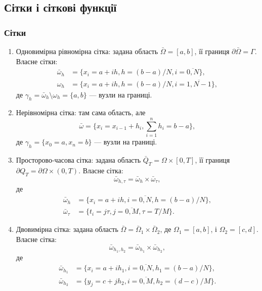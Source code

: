 \subsection{Сітки і сіткові функції}

\subsubsection{Сітки}

\begin{enumerate}
    \item Одновимірна рівномірна сітка: задана область $\bar \Omega = [a, b]$, її границя $\partial \bar \Omega = \Gamma$. Власне сітки:
    \begin{align}
        \label{eq:4.2.1}
        \bar \omega_h &= \{x_i = a + i h, h = (b - a) / N, i = \overline{0, N}\}, \\
        \label{eq:4.2.2}
        \omega_h &= \{x_i = a + i h, h = (b - a) / N, i = \overline{1, N - 1}\},
    \end{align}
    де $\gamma_h = \bar \omega_h \setminus \omega_h = \{a, b\}$ --- вузли на границі.
    
    \item Нерівномірна сітка: там сама область, але
    \begin{equation}
        \label{eq:4.2.3}
        \bar \omega = \{ x_i = x_{i - 1} + h_i, \sum_{i = 1}^n h_i = b - a \} ,
    \end{equation}
    де $\gamma_h = \{x_0 = a, x_n = b\}$ --- вузли на границі.
    
    \item Просторово-часова сітка: задана область $\bar Q_T = \Omega \times [0, T]$, її границя $\partial Q_T = \partial \Omega \times (0, T)$. Власне сітка:
    \begin{equation}
        \label{eq:4.2.4}
        \bar \omega_{h, \tau} = \bar \omega_h \times \bar \omega_\tau,
    \end{equation}
    де
    \begin{align}
        \label{eq:4.2.5}
        \bar \omega_h &= \{ x_i = a + i h, i = \overline{0, N}, h = (b - a) / N\}, \\
        \label{eq:4.2.6}
        \bar \omega_\tau &= \{ t_i = j \tau, j = \overline{0, M}, \tau = T / M\}.
    \end{align}
    
    \item Двовимірна сітка: задана область $\bar \Omega = \bar \Omega_1 \times \bar \Omega_2$, де $\Omega_1 = [a, b]$, і $\Omega_2 = [c, d]$. Власне сітка:
    \begin{equation}
        \label{eq:4.2.7}
        \bar \omega_{h_1, h_2} = \bar \omega_{h_1} \times \bar \omega_{h_2},
    \end{equation}
    де
    \begin{align}
        \label{eq:4.2.8}
        \bar \omega_{h_1} &= \{ x_i = a + i h_1, i = \overline{0, N}, h_1 = (b - a) / N\}, \\
        \label{eq:4.2.9}
        \bar \omega_{h_2} &= \{ y_j = c + j h_2, i = \overline{0, M}, h_2 = (d - c) / M\}.
    \end{align}
    

\end{enumerate}

